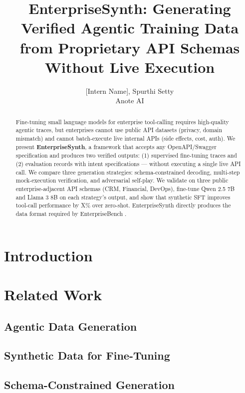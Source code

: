 \documentclass{article}
\title{EnterpriseSynth: Generating Verified Agentic Training Data from Proprietary API Schemas Without Live Execution}
\author{[Intern Name], Spurthi Setty \\
Anote AI}
\date{}
\begin{document}
\maketitle

\begin{abstract}
\noindent
Fine-tuning small language models for enterprise tool-calling requires high-quality agentic traces, but enterprises cannot use public API datasets (privacy, domain mismatch) and cannot batch-execute live internal APIs (side effects, cost, auth). We present \textbf{EnterpriseSynth}, a framework that accepts any OpenAPI/Swagger specification and produces two verified outputs: (1) supervised fine-tuning traces and (2) evaluation records with intent specifications --- without executing a single live API call. We compare three generation strategies: schema-constrained decoding, multi-step mock-execution verification, and adversarial self-play. We validate on three public enterprise-adjacent API schemas (CRM, Financial, DevOps), fine-tune Qwen 2.5 7B and Llama 3 8B on each strategy's output, and show that synthetic SFT improves tool-call performance by X\% over zero-shot. EnterpriseSynth directly produces the data format required by EnterpriseBench \cite{agenticeval}.
\end{abstract}

\section{Introduction}

\section{Related Work}
\subsection{Agentic Data Generation}
\subsection{Synthetic Data for Fine-Tuning}
\subsection{Schema-Constrained Generation}
\end{document}
